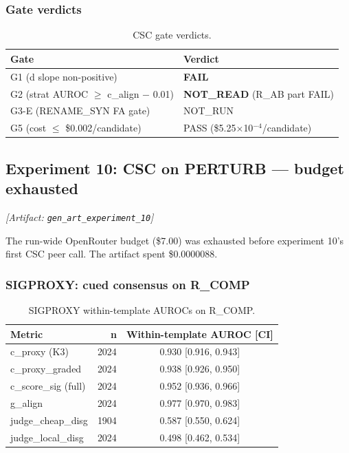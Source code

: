 \documentclass[11pt,letterpaper]{article}
\begin{document}
\subsubsection{Gate verdicts}

\begin{table}[!htbp]
\centering
\caption{CSC gate verdicts.}
\label{tab:csc_gates}
\begin{tabular}{ll}
\toprule
Gate & Verdict \\
\midrule
G1 (d slope non-positive) & \textbf{FAIL} \\
G2 (strat AUROC $\geq$ c\_align $-$ 0.01) & \textbf{NOT\_READ} (R\_AB part FAIL) \\
G3-E (RENAME\_SYN FA gate) & NOT\_RUN \\
G5 (cost $\leq$ \$0.002/candidate) & PASS (\$5.25$\times$10$^{-4}$/candidate) \\
\bottomrule
\end{tabular}
\end{table}

\subsection{Experiment 10: CSC on PERTURB --- budget exhausted}
\label{sec:exp10}
\noindent\textit{[Artifact: \texttt{gen\_art\_experiment\_10}]}

The run-wide OpenRouter budget (\$7.00) was exhausted before experiment 10's first CSC peer call. The artifact spent \$0.0000088.

\subsubsection{SIGPROXY: cued consensus on R\_COMP}

\begin{table}[!htbp]
\centering
\caption{SIGPROXY within-template AUROCs on R\_COMP.}
\label{tab:sigproxy}
\begin{tabular}{lrc}
\toprule
Metric & n & Within-template AUROC [CI] \\
\midrule
c\_proxy (K3) & 2024 & 0.930 [0.916, 0.943] \\
c\_proxy\_graded & 2024 & 0.938 [0.926, 0.950] \\
c\_score\_sig (full) & 2024 & 0.952 [0.936, 0.966] \\
g\_align & 2024 & 0.977 [0.970, 0.983] \\
judge\_cheap\_disg & 1904 & 0.587 [0.550, 0.624] \\
judge\_local\_disg & 2024 & 0.498 [0.462, 0.534] \\
\bottomrule
\end{tabular}
\end{table}
\end{document}
